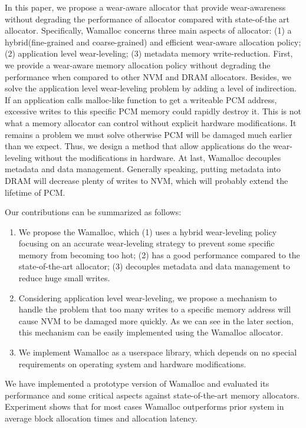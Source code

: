 \documentclass{vldb}
\begin{document}
In this paper, we propose a wear-aware allocator that provide wear-awareness without degrading the performance of allocator compared with state-of-the art allocator. 
Specifically, Wamalloc concerns three main aspects of allocator:
(1) a hybrid(fine-grained and coarse-grained) and efficient wear-aware allocation policy;
(2) application level wear-leveling;
(3) metadata memory write-reduction.
First, we provide a wear-aware memory allocation policy without degrading the performance when compared to other NVM and DRAM allocators.
Besides, we solve the application level wear-leveling problem by adding a level of indirection.
If an application calls malloc-like function to get a writeable PCM address, excessive writes to this specific PCM memory could rapidly destroy it. 
This is not what a memory allocator can control without explicit hardware modifications.
It remains a problem we must solve otherwise PCM will be damaged much earlier than we expect.
Thus, we design a method that allow applications do the wear-leveling without the modifications in hardware.
At last, Wamalloc decouples metadata and data management.
Generally speaking, putting metadata into DRAM will decrease plenty of writes to NVM, which will probably extend the lifetime of PCM.

Our contributions can be summarized as follows:
\begin{enumerate}
    \item We propose the Wamalloc, which
        (1) uses a hybrid wear-leveling policy focusing on an accurate wear-leveling strategy to prevent some specific memory from becoming too hot;
        (2) has a good performance compared to the state-of-the-art allocator;
        (3) decouples metadata and data management to reduce huge small writes.
    \item Considering application level wear-leveling, 
        we propose a mechanism to handle the problem that too many writes to a specific memory address will cause NVM to be damaged more quickly.
        As we can see in the later section, this mechanism can be easily implemented using the Wamalloc allocator.
    \item We implement Wamalloc as a userspace library, which depends on no special requirements on operating system and hardware modifications.
\end{enumerate}

We have implemented a prototype version of Wamalloc and evaluated its performance and some critical aspects against state-of-the-art memory allocators. 
Experiment shows that for most cases Wamalloc outperforms prior system in average block allocation times and allocation latency.
\end{document}
